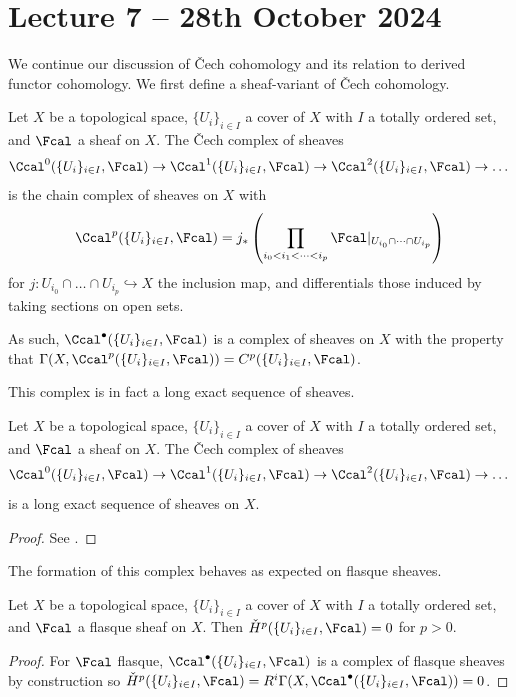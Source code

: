 \section{Lecture 7 -- 28th October 2024}\label{sec: lecture 7}
We continue our discussion of \v{C}ech cohomology and its relation to derived functor cohomology. We first define a sheaf-variant of \v{C}ech cohomology. 
\begin{definition}\label{def: Cech complex of sheaves}
    Let $X$ be a topological space, $\{U_{i}\}_{i\in I}$ a cover of $X$ with $I$ a totally ordered set, and $\Fcal$ a sheaf on $X$. The \v{C}ech complex of sheaves 
    $$\Ccal^{0}(\{U_{i}\}_{i\in I},\Fcal)\to\Ccal^{1}(\{U_{i}\}_{i\in I},\Fcal)\to\Ccal^{2}(\{U_{i}\}_{i\in I},\Fcal)\to\dots$$
    is the chain complex of sheaves on $X$ with 
    $$\Ccal^{p}(\{U_{i}\}_{i\in I},\Fcal)=j_{*}\left(\prod_{i_{0}<i_{1}<\dots<i_{p}}\Fcal|_{U_{i_{0}}\cap\dots\cap U_{i_{p}}}\right)$$
    for $j:U_{i_{0}}\cap\dots\cap U_{i_{p}}\hookrightarrow X$ the inclusion map, and differentials those induced by taking sections on open sets. 
\end{definition}
\begin{remark}
    As such, $\Ccal^{\bullet}(\{U_{i}\}_{i\in I},\Fcal)$ is a complex of sheaves on $X$ with the property that $\Gamma(X,\Ccal^{p}(\{U_{i}\}_{i\in I},\Fcal))=C^{p}(\{U_{i}\}_{i\in I},\Fcal)$. 
\end{remark}
This complex is in fact a long exact sequence of sheaves. 
\begin{proposition}\label{prop: Cech complex of sheaves is a long exact sequence}
    Let $X$ be a topological space, $\{U_{i}\}_{i\in I}$ a cover of $X$ with $I$ a totally ordered set, and $\Fcal$ a sheaf on $X$. The \v{C}ech complex of sheaves 
    $$\Ccal^{0}(\{U_{i}\}_{i\in I},\Fcal)\to\Ccal^{1}(\{U_{i}\}_{i\in I},\Fcal)\to\Ccal^{2}(\{U_{i}\}_{i\in I},\Fcal)\to\dots$$
    is a long exact sequence of sheaves on $X$. 
\end{proposition}
\begin{proof}
    See \cite[Lem. 4.2]{Hartshorne}. 
\end{proof}
The formation of this complex behaves as expected on flasque sheaves. 
\begin{proposition}
    Let $X$ be a topological space, $\{U_{i}\}_{i\in I}$ a cover of $X$ with $I$ a totally ordered set, and $\Fcal$ a flasque sheaf on $X$. Then $\check{H}^{p}(\{U_{i}\}_{i\in I},\Fcal)=0$ for $p>0$. 
\end{proposition}
\begin{proof}
    For $\Fcal$ flasque, $\Ccal^{\bullet}(\{U_{i}\}_{i\in I},\Fcal)$ is a complex of flasque sheaves by construction so $\check{H}^{p}(\{U_{i}\}_{i\in I},\Fcal)=R^{i}\Gamma(X,\Ccal^{\bullet}(\{U_{i}\}_{i\in I},\Fcal))=0$.
\end{proof}
